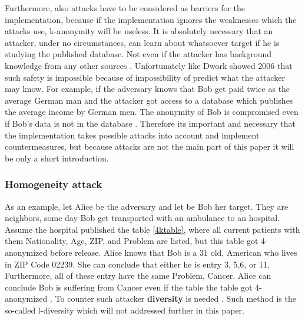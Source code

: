 \documentclass{llncs}
\begin{document}
Furthermore, also attacks have to be considered as barriers for the implementation, because if the implementation ignores the weaknesses which the attacks use, k-anonymity will be useless. 
It is absolutely necessary that an attacker, under no circumstances, can learn about whatsoever target if he is studying the published database. Not even if the attacker has background knowledge from any other sources  \cite{Dalenius1977}. Unfortunately like Dwork showed 2006 that such safety is impossible because of impossibility of predict what the attacker may know. For example, if the adversary knows that Bob get paid twice as the average German man and the attacker got access to a database which publishes the average income by German men. The anonymity of Bob is compromised even if Bob's data is not in the database \cite{dwork2011differential}. Therefore its important and necessary that the implementation takes possible attacks into account and implement countermeasures, but because attacks are not the main part of this paper it will be only a short introduction. 

\subsubsection{Homogeneity attack}

As an example, let Alice be the adversary and let be Bob her target. They are neighbors, some day Bob get transported with an ambulance to an hospital. Assume the hospital published the table \ref{4ktable}, where all current patients with them Nationality, Age, ZIP, and Problem are listed, but this table got 4-anonymized before release. Alice knows that Bob is a 31 old, American who lives in ZIP Code 02239. She can conclude that either he is entry 3, 5,6, or 11. Furthermore, all of these entry have the same Problem, Cancer. Alice can conclude Bob is suffering from Cancer even if the table the table got 4-anonymized \cite{sweeney2002k,ldiversity}. To counter such attacker \textbf{diversity} is needed \cite{ldiversity}. Such method is the so-called l-diversity which will not addressed further in this paper.  
\end{document}
